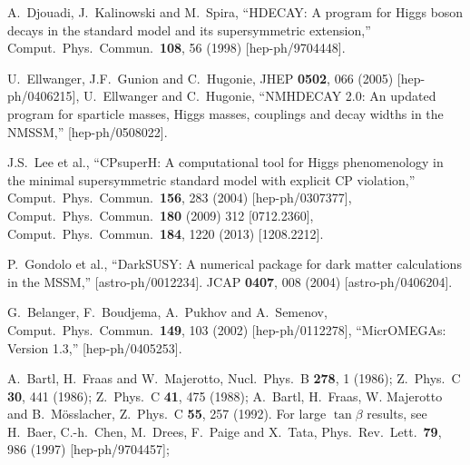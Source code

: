 \documentclass[11pt]{article}
\begin{document}
\begin{thebibliography}{999}
A.~Djouadi, J.~Kalinowski and M.~Spira,
  ``HDECAY: A program for Higgs boson decays in the standard model and its
  supersymmetric extension,''
  Comput.\ Phys.\ Commun.\  {\bf 108}, 56 (1998)
  [hep-ph/9704448].

U.~Ellwanger, J.F.~Gunion and C.~Hugonie,
  JHEP {\bf 0502}, 066 (2005)
  [hep-ph/0406215],
U.~Ellwanger and C.~Hugonie,
  ``NMHDECAY 2.0: An updated program for sparticle masses, Higgs masses,
  couplings and decay widths in the NMSSM,''
  [hep-ph/0508022].

J.S.~Lee et al.,
  ``CPsuperH: A computational tool for Higgs phenomenology in the minimal
  supersymmetric standard model with explicit CP violation,''
  Comput.\ Phys.\ Commun.\  {\bf 156}, 283 (2004)
  [hep-ph/0307377],
  Comput.\ Phys.\ Commun.\  {\bf 180} (2009) 312
  [0712.2360],
  Comput.\ Phys.\ Commun.\  {\bf 184}, 1220 (2013)
  [1208.2212].
  
P.~Gondolo et al.,
  ``DarkSUSY: A numerical package for dark matter calculations in the MSSM,''
  [astro-ph/0012234].
  JCAP {\bf 0407}, 008 (2004)
  [astro-ph/0406204].

G.~Belanger, F.~Boudjema, A.~Pukhov and A.~Semenov,
  Comput.\ Phys.\ Commun.\  {\bf 149}, 103 (2002)
  [hep-ph/0112278],
  ``MicrOMEGAs: Version 1.3,''
  [hep-ph/0405253].

  A.~Bartl, H.~Fraas and W.~Majerotto,
  Nucl.\ Phys.\ B {\bf 278}, 1 (1986);
  Z.\ Phys.\ C {\bf 30}, 441 (1986);
  Z.\ Phys.\ C {\bf 41}, 475 (1988);
A.~Bartl, H.~Fraas, W. Majerotto and B.~M\"osslacher,
  Z.\ Phys.\ C {\bf 55}, 257 (1992).
For large $\tan\beta$ results, see 
H.~Baer, C.-h.~Chen, M.~Drees, F.~Paige and X.~Tata,
  Phys.\ Rev.\ Lett.\  {\bf 79}, 986 (1997)
  [hep-ph/9704457];


\end{thebibliography}
\end{document}
